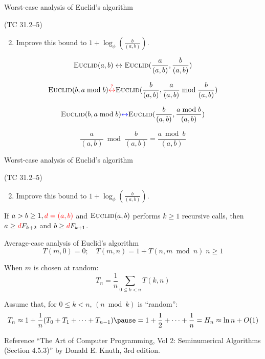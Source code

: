 \begin{frame}{Worst-case analysis of Euclid's algorithm}
  \begin{exampleblock}{(TC 31.2--5)}
	\begin{enumerate}
	  \setcounter{enumi}{1}
	  \item Improve this bound to $1 + \log_{\phi}(\frac{b}{(a,b)})$.
	\end{enumerate}
  \end{exampleblock}

  \[
	\textsc{Euclid}(a,b) \leftrightarrow \textsc{Euclid}(\frac{a}{(a,b)}, \frac{b}{(a,b)})
  \]

  \pause
  \[
	\textsc{Euclid}(b, a \bmod b) \textcolor{red}{\stackrel{?}{\leftrightarrow}} \textsc{Euclid}(\frac{b}{(a,b)}, \frac{a}{(a,b)} \bmod \frac{b}{(a,b)})
  \]

  \pause
  \[
	\textsc{Euclid}(b, a \bmod b) \textcolor{blue}{\leftrightarrow} \textsc{Euclid}(\frac{b}{(a,b)}, \frac{a \bmod b}{(a,b)})
  \]

  \pause
  \[
	\frac{a}{(a,b)} \bmod \frac{b}{(a,b)} = \frac{a \bmod b}{(a,b)}
  \]
\end{frame}
\begin{frame}{Worst-case analysis of Euclid's algorithm}
  \begin{exampleblock}{(TC 31.2--5)}
	\begin{enumerate}
	  \setcounter{enumi}{1}
	  \item Improve this bound to $1 + \log_{\phi}(\frac{b}{(a,b)})$.
	\end{enumerate}
  \end{exampleblock}

  \begin{Lemma}
	If $a > b \ge 1, \textcolor{red}{d = (a,b)}$ and $\textsc{Euclid}(a,b)$ performs $k \ge 1$ recursive calls,
	then $a \ge \textcolor{red}{d}F_{k+2}$ and $b \ge \textcolor{red}{d}F_{k+1}$.
  \end{Lemma}
\end{frame}
\begin{frame}{Average-case analysis of Euclid's algorithm}
  \[
	T(m,0) = 0; \quad T(m,n) = 1 + T(n, m \bmod n) \; n \ge 1
  \]
  
  \pause
  When $m$ is chosen at random:
  \[
	T_n = \frac{1}{n} \sum_{0 \le k < n} T(k,n)
  \]

  \pause
  Assume that, for $0 \le k < n$, $(n \bmod k)$ is ``random'':
  \[
	T_n \approx 1 + \frac{1}{n} (T_0 + T_1 + \cdots + T_{n-1}) \pause = 1 + \frac{1}{2} + \cdots + \frac{1}{n} = H_n \approx \ln n + O(1)
  \]

  \pause
  \begin{alertblock}{Reference}
	``The Art of Computer Programming, Vol 2: Seminumerical Algorithms (Section 4.5.3)'' by Donald E. Knuth, 3rd edition.
  \end{alertblock}
\end{frame}
